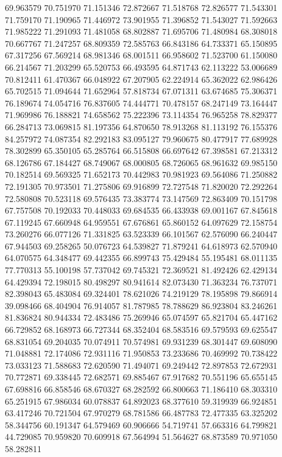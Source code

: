 69.963579
70.751970
71.151346
72.872667
71.518768
72.826577
71.543301
71.759170
71.190965
71.446972
73.901955
71.396852
71.543027
71.592663
71.985222
71.291093
71.481058
68.802887
71.695706
71.480984
68.308018
70.667767
71.247257
68.809359
72.585763
66.843186
64.733371
65.150895
67.317256
67.569214
68.981346
68.001511
66.958602
71.523700
61.150080
66.214567
71.203299
65.520753
66.493595
64.871743
62.113222
53.006689
70.812411
61.470367
66.048922
67.207905
62.224914
65.362022
62.986426
65.702515
71.094644
71.652964
57.818734
67.071311
63.674685
75.306371
76.189674
74.054716
76.837605
74.444771
70.478157
68.247149
73.164447
71.969986
76.188821
74.658562
75.222396
73.114354
76.965258
78.829377
66.284713
73.069815
81.197356
64.870650
78.913268
81.113192
76.155376
84.257972
74.087354
82.292183
83.095127
79.960675
80.477917
77.689928
78.302899
65.350105
65.285764
66.515808
66.697642
67.398581
67.213312
68.126786
67.184427
68.749067
68.000805
68.726065
68.961632
69.985150
70.182514
69.569325
71.652173
70.442983
70.981923
69.564086
71.250882
72.191305
70.973501
71.275806
69.916899
72.727548
71.820020
72.292264
72.580808
70.523118
69.576435
73.383774
73.147569
72.863409
70.151798
67.757508
70.192033
70.448033
69.684535
66.433938
69.001167
67.845618
67.119245
67.660948
64.959551
67.676861
65.860152
64.097629
72.158754
73.260276
66.077126
71.331825
63.523339
66.101567
62.576090
66.240447
67.944503
69.258265
50.076723
64.539827
71.879241
64.618973
62.570940
64.070575
64.348477
69.442355
66.899743
75.429484
55.195481
68.011135
77.770313
55.100198
57.737042
69.745321
72.369521
81.492426
62.429134
64.429394
72.198015
80.498297
80.941614
82.073430
71.363234
76.737071
82.398043
65.483084
69.324401
78.621026
74.219129
78.195898
79.866914
39.098466
68.404904
76.914057
81.787985
78.788629
86.923804
83.246261
81.836824
80.944334
72.483486
75.269946
65.074597
65.821704
65.447162
66.729852
68.168973
66.727344
68.352404
68.583516
69.579593
69.625547
68.831054
69.204035
70.074911
70.574981
69.931239
68.301447
69.608090
71.048881
72.174086
72.931116
71.950853
73.233686
70.469992
70.738422
73.033123
71.588683
72.620590
71.494071
69.249442
72.897853
72.672931
70.772871
69.338445
72.682571
69.885467
67.917682
70.551196
65.655145
67.698816
66.858546
68.670327
68.282592
66.800663
71.186410
68.303310
65.251915
67.986034
60.078837
64.892023
68.377610
59.319939
66.924851
63.417246
70.721504
67.970279
68.781586
66.487783
72.477335
63.325202
58.344756
60.191347
64.579469
60.906666
54.719741
57.663316
64.799821
44.729085
70.959820
70.609918
67.564994
51.564627
68.873589
70.971050
58.282811
